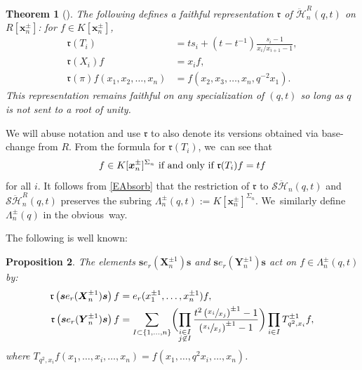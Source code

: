 \documentclass[JEP,XML,SOM,Unicode,published]{cedram}
\newtheorem{thm}{Theorem}[section]
\newtheorem{prop}[thm]{Proposition}
\theoremstyle{definition}
\newcommand{\SHH}{\mathcal{S}\ddot{\mathcal{H}}}
\newcommand{\HH}{\ddot{\mathcal{H}}}
\newcommand{\ee}{\boldsymbol{s}}
\newcommand{\xx}{\boldsymbol{x}}
\newcommand{\rrr}{\mathfrak{r}}
\begin{document}
\begin{thm}[{\cite[Th.\,2.3]{ChereAnnals}}]
The following defines a faithful representation $\mathfrak{r}$ of $\HH_{n}^R(q,t)$ on $R[\xx_n^\pm]$: for $f\in K[\xx_n^\pm]$,
\begin{align*}
\mathfrak{r}(T_i)&=ts_i+(t-t^{-1})\frac{s_i-1}{x_i/x_{i+1}-1},\\
\rrr(X_i)f&=x_if,\\
\rrr(\pi)f(x_1,x_2,\ldots, x_n)&=f(x_2,x_3,\ldots, x_n, q^{-2}x_1).
\end{align*}
This representation remains faithful on any specialization of $(q,t)$ so long as $q$ is not sent to a root of unity.
\end{thm}

We will abuse notation and use $\rrr$ to also denote its versions obtained via base-change from $R$.
From the formula for $\rrr(T_i)$, we~can see that
\[
f\in K[\xx_n^\pm]^{\Sigma_n}\hbox{ if and only if }\rrr(T_i)f=tf
\]
for all $i$.
It follows from \eqref{EAbsorb} that the restriction of $\rrr$ to $\SHH_{n}(q,t)$ and $\SHH_n^R(q,t)$ preserves the subring $\Lambda_n^\pm(q,t):=K[\xx_n^\pm]^{\Sigma_n}$. We~similarly define $\Lambda_n^\pm(q)$ in the obvious~way.

The following is well known:
\begin{prop}\label{MacGen}
The elements $\ee e_r(\boldsymbol{X}_n^{\pm 1})\ee$ and $\ee e_r(\boldsymbol{Y}_n^{\pm 1})\ee$ act on $f\in\Lambda^\pm_n(q,t)$ by:
\begin{align*}
\rrr\left(\ee e_r(\boldsymbol{X}_n^{\pm 1})\ee\right) f&=e_r(x_1^{\pm 1},\ldots, x_n^{\pm 1})f,\\
\rrr\left(\ee e_r(\boldsymbol{Y}_n^{\pm 1})\ee\right) f&=\sum_{I\subset\{1,\ldots, n\}}\biggl(\prod_{\substack{i\in I\\ j\not\in I}}\frac{t^2\left(\sfrac{x_i}{x_j}\right)^{\pm 1}-1}{\left(\sfrac{x_i}{x_j}\right)^{\pm 1}-1}\biggr)\prod_{i\in I}T_{q^2, x_i}^{\pm 1} f,
\end{align*}
where $T_{q^2, x_i}f(x_1,\ldots, x_i,\ldots,x_n)=f(x_1,\ldots, q^2x_i,\ldots, x_n)$.
\end{prop}
\end{document}
